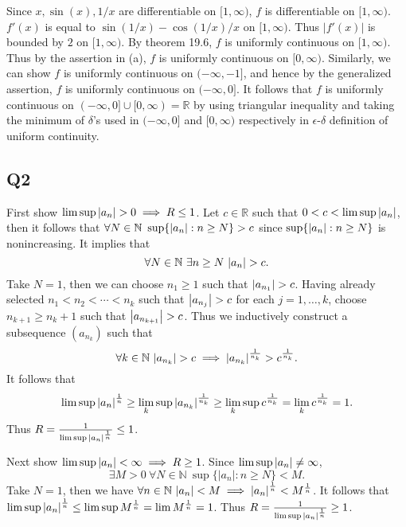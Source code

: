 \documentclass[12pt,lettersize]{article}
\newcommand{\R}{\mathbb{R}}
\newcommand{\N}{\mathbb{N}}
\begin{document}
\begin{enumerate}[(a)]
		Since $x,\sin(x),1/x$ are differentiable on $[1,\infty)$, $f$ is differentiable on $[1,\infty)$. $f'(x)$ is equal to $\sin(1/x)-\cos(1/x)/x$ on $[1,\infty)$. Thus $|f'(x)|$ is bounded by $2$ on $[1,\infty)$. By theorem 19.6, $f$ is uniformly continuous on $[1,\infty)$. Thus by the assertion in (a), $f$ is uniformly continuous on $[0,\infty)$. Similarly, we can show $f$ is uniformly continuous on $(-\infty,-1]$, and hence by the generalized assertion, $f$ is uniformly continuous on $(-\infty,0]$. It follows that $f$ is uniformly continuous on $(-\infty,0]\cup[0,\infty)=\R$ by using triangular inequality and taking the minimum of $\delta$'s used in $(-\infty,0]$ and $[0,\infty)$ respectively in $\epsilon$-$\delta$ definition of uniform continuity. 
		
	\end{enumerate}
	\newpage
	
	\subsection*{Q2}
	First show $\lim\sup\abs{a_n}>0\implies R\leq 1$. Let $c\in\R$ such that $0<c<\lim\sup\abs{a_n}$, then it follows that $\forall N\in\N\ \sup\{\abs{a_n}:n\geq N\}>c$ since $\sup\{\abs{a_n}:n\geq N\}$ is nonincreasing. It implies that \begin{displaymath}
		\forall N\in\N\ \exists n\geq N\ \abs{a_n}>c.
	\end{displaymath}
	Take $N=1$, then we can choose $n_1\geq1$ such that $\abs{a_{n_1}}>c$. Having already selected $n_1<n_2<\cdots<n_k$ such that $\abs{a_{n_j}}>c$ for each $j=1,\dots,k$, choose $n_{k+1}\geq n_k+1$ such that $\abs{a_{n_{k+1}}}>c$. Thus we inductively construct a subsequence $(a_{n_k})$ such that
	\begin{displaymath}
		\forall k\in\N\ \abs{a_{n_k}}>c\implies \abs{a_{n_k}}^\frac{1}{n_k}>c^\frac{1}{n_k}.
	\end{displaymath}
	It follows that
	\begin{displaymath}
		\lim\sup\abs{a_n}^\frac{1}{n}\geq\lim_k\sup\abs{a_{n_k}}^\frac{1}{n_k}\geq\lim_k\sup c^\frac{1}{n_k}=\lim_k c^\frac{1}{n_k}=1.
	\end{displaymath}
	Thus $R=\frac{1}{\lim\sup\abs{a_n}^\frac{1}{n}}\leq 1$.\smallskip
	
	Next show $\lim\sup\abs{a_n}<\infty\implies R\geq 1$. Since $\lim\sup\abs{a_n}\neq\infty$,
	\begin{displaymath}
		\exists M>0\ \forall N\in\N\ \sup\{|a_n|:n\geq N\}<M.
	\end{displaymath}
	Take $N=1$, then we have $\forall n\in\N\ \abs{a_n}<M\implies \abs{a_n}^\frac{1}{n}<M^\frac{1}{n}$. It follows that $\lim\sup\abs{a_n}^\frac{1}{n}\leq\lim\sup M^\frac{1}{n}=\lim M^\frac{1}{n}=1$. Thus $R=\frac{1}{\lim\sup\abs{a_n}^\frac{1}{n}}\geq 1$.\smallskip
	
\end{document}
